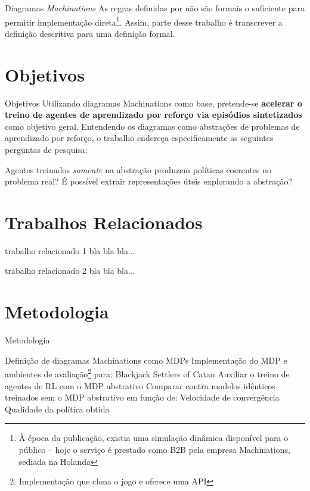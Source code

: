 \documentclass[aspectratio=169]{beamer}
\begin{document}
\begin{frame}{Diagramas \textit{Machinations}}
    As regras definidas por \citeauthor{machinations} não são formais o suficiente para permitir implementação direta\footnote{À época da publicação, existia uma simulação dinâmica disponível para o público -- hoje o serviço é prestado como B2B pela empresa Machinations, sediada na Holanda}. Assim, parte desse trabalho é transcrever a definição descritiva para uma definição formal.
\end{frame}

\section{Objetivos}

\begin{frame}{Objetivos}
    Utilizando diagramas Machinations como base, pretende-se \textbf{acelerar o treino de agentes de aprendizado por reforço via episódios sintetizados} como objetivo geral. Entendendo os diagramas como abstrações de problemas de aprendizado por reforço, o trabalho endereça especificamente as seguintes perguntas de pesquisa:
    \begin{outline}
        \1 Agentes treinados \textit{somente} na abstração produzem políticas coerentes no problema real?
        \1 É possível extrair representações úteis explorando a abstração?
    \end{outline}
\end{frame}

\section{Trabalhos Relacionados}
\begin{frame}{trabalho relacionado 1}
    bla bla bla...
\end{frame}
\begin{frame}{trabalho relacionado 2}
    bla bla bla...
\end{frame}


\section{Metodologia}

\begin{frame}{Metodologia}
    \begin{outline}[enumerate]
	\1 Definição de diagramas Machinations como MDPs
	\1 Implementação do MDP e ambientes de avaliação\footnote{Implementação que clona o jogo e oferece uma API} para:
            \2 Blackjack
            \2 Settlers of Catan
	\1 Auxiliar o treino de agentes de RL com o MDP abstrativo
	\1 Comparar contra modelos idênticos treinados sem o MDP abstrativo em função de:
	    \2 Velocidade de convergência
	    \2 Qualidade da política obtida
    \end{outline}
\end{frame}
\end{document}

